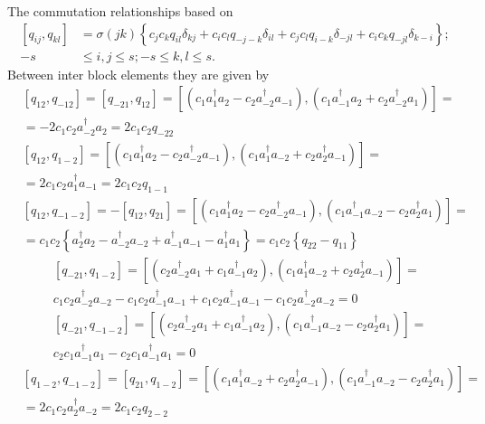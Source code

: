 \documentclass[aps,preprint]{revtex4}%
\begin{document}
The commutation relationships based on
\begin{align}
\left[  q_{ij},q_{kl}\right]   &  =\sigma\left(  jk\right)  \left\{
c_{j}c_{k}q_{il}\delta_{kj}+c_{i}c_{l}q_{-j-k}\delta_{il}+c_{j}c_{l}%
q_{i-k}\delta_{-jl}+c_{i}c_{k}q_{-jl}\delta_{k-i}\right\}  ;\\
-s  &  \leq i,j\leq s;-s\leq k,l\leq s.
\end{align}
Between inter block elements they are given by%
\begin{align}
&  \left[  q_{12},q_{-12}\right]  =\left[  q_{-21},q_{12}\right]  =\left[
\left(  c_{1}a_{1}^{\dagger}a_{2}-c_{2}a_{-2}^{\dagger}a_{-1}\right)  ,\left(
c_{1}a_{-1}^{\dagger}a_{2}+c_{2}a_{-2}^{\dagger}a_{1}\right)  \right]  =\\
&  =-2c_{1}c_{2}a_{-2}^{\dagger}a_{2}=2c_{1}c_{2}q_{-22}\\
&  \left[  q_{12},q_{1-2}\right]  =\left[  \left(  c_{1}a_{1}^{\dagger}%
a_{2}-c_{2}a_{-2}^{\dagger}a_{-1}\right)  ,\left(  c_{1}a_{1}^{\dagger}%
a_{-2}+c_{2}a_{2}^{\dagger}a_{-1}\right)  \right]  =\\
&  =2c_{1}c_{2}a_{1}^{\dagger}a_{-1}=2c_{1}c_{2}q_{1-1}\\
&  \left[  q_{12},q_{-1-2}\right]  =-\left[  q_{12},q_{21}\right]  =\left[
\left(  c_{1}a_{1}^{\dagger}a_{2}-c_{2}a_{-2}^{\dagger}a_{-1}\right)  ,\left(
c_{1}a_{-1}^{\dagger}a_{-2}-c_{2}a_{2}^{\dagger}a_{1}\right)  \right]  =\\
&  =c_{1}c_{2}\left\{  a_{2}^{\dagger}a_{2}-a_{-2}^{\dagger}a_{-2}%
+a_{-1}^{\dagger}a_{-1}-a_{1}^{\dagger}a_{1}\right\}  =c_{1}c_{2}\left\{
q_{22}-q_{11}\right\}
\end{align}%
\begin{align}
&  \left[  q_{-21},q_{1-2}\right]  =\left[  \left(  c_{2}a_{-2}^{\dagger}%
a_{1}+c_{1}a_{-1}^{\dagger}a_{2}\right)  ,\left(  c_{1}a_{1}^{\dagger}%
a_{-2}+c_{2}a_{2}^{\dagger}a_{-1}\right)  \right]  =\nonumber\\
&  c_{1}c_{2}a_{-2}^{\dagger}a_{-2}-c_{1}c_{2}a_{-1}^{\dagger}a_{-1}%
+c_{1}c_{2}a_{-1}^{\dagger}a_{-1}-c_{1}c_{2}a_{-2}^{\dagger}a_{-2}%
=0\nonumber\\
&  \left[  q_{-21},q_{-1-2}\right]  =\left[  \left(  c_{2}a_{-2}^{\dagger
}a_{1}+c_{1}a_{-1}^{\dagger}a_{2}\right)  ,\left(  c_{1}a_{-1}^{\dagger}%
a_{-2}-c_{2}a_{2}^{\dagger}a_{1}\right)  \right]  =\nonumber\\
&  c_{2}c_{1}a_{-1}^{\dagger}a_{1}-c_{2}c_{1}a_{-1}^{\dagger}a_{1}=0
\end{align}%
\begin{align}
&  \left[  q_{1-2},q_{-1-2}\right]  =\left[  q_{21},q_{1-2}\right]  =\left[
\left(  c_{1}a_{1}^{\dagger}a_{-2}+c_{2}a_{2}^{\dagger}a_{-1}\right)  ,\left(
c_{1}a_{-1}^{\dagger}a_{-2}-c_{2}a_{2}^{\dagger}a_{1}\right)  \right]
=\nonumber\\
&  \left.  =\right.  2c_{1}c_{2}a_{2}^{\dagger}a_{-2}=2c_{1}c_{2}q_{2-2}%
\end{align}%
\end{document}
